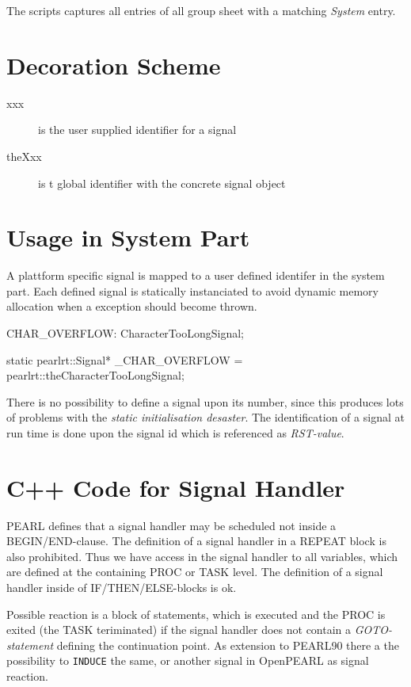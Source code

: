 The scripts captures all entries of all group sheet with a matching
{\em System} entry.

\section{Decoration Scheme}
\begin{description}
\item[xxx] is the user supplied identifier for a signal
\item[theXxx] is t global identifier with the concrete signal object
\end{description}

\section{Usage in System Part}
A plattform specific signal is mapped to a user defined identifer in the 
system part. 
Each defined signal is statically instanciated to avoid
dynamic memory allocation when a exception should become thrown. 

\begin{PEARLCode}
CHAR_OVERFLOW: CharacterTooLongSignal;
\end{PEARLCode}

\begin{CppCode}
static pearlrt::Signal* _CHAR_OVERFLOW = pearlrt::theCharacterTooLongSignal;
\end{CppCode}

There is no possibility to define a signal upon its number, since this
produces lots of problems with the {\em static initialisation desaster}.
The identification of a signal at run time is done upon the signal id
which is referenced as {\em RST-value}.


\section{C++ Code for Signal Handler}
PEARL defines that a signal handler may be scheduled not inside 
a BEGIN/END-clause. The definition of a signal handler in a REPEAT block is also
prohibited. Thus we have access in the signal handler to all variables, which are defined
at the containing PROC or TASK level.
The definition of a signal handler inside of IF/THEN/ELSE-blocks is ok.

Possible reaction is a block of statements, which is executed and the
PROC is exited (the TASK teriminated) if the signal handler does not
contain a {\em GOTO-statement} defining the continuation point.
As extension to PEARL90 there a the possibility to \verb|INDUCE| the same, or another signal in OpenPEARL as signal reaction.
 
